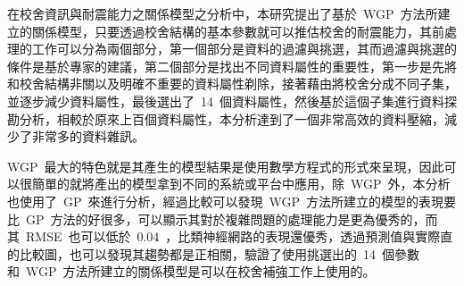 
在校舍資訊與耐震能力之關係模型之分析中，本研究提出了基於~WGP~方法所建立的關係模型，只要透過校舍結構的基本參數就可以推估校舍的耐震能力，其前處理的工作可以分為兩個部分，第一個部分是資料的過濾與挑選，其而過濾與挑選的條件是基於專家的建議，第二個部分是找出不同資料屬性的重要性，第一步是先將和校舍結構非關以及明確不重要的資料屬性剃除，接著藉由將校舍分成不同子集，並逐步減少資料屬性，最後選出了~14~個資料屬性，然後基於這個子集進行資料探勘分析，相較於原來上百個資料屬性，本分析達到了一個非常高效的資料壓縮，減少了非常多的資料雜訊。


WGP~最大的特色就是其產生的模型結果是使用數學方程式的形式來呈現，因此可以很簡單的就將產出的模型拿到不同的系統或平台中應用，除~WGP~外，本分析也使用了~GP~來進行分析，經過比較可以發現~WGP~方法所建立的模型的表現要比~GP~方法的好很多，可以顯示其對於複雜問題的處理能力是更為優秀的，而其~RMSE~也可以低於~0.04~，比類神經網路的表現還優秀，透過預測值與實際直的比較圖，也可以發現其趨勢都是正相關，驗證了使用挑選出的~14~個參數和~WGP~方法所建立的關係模型是可以在校舍補強工作上使用的。

